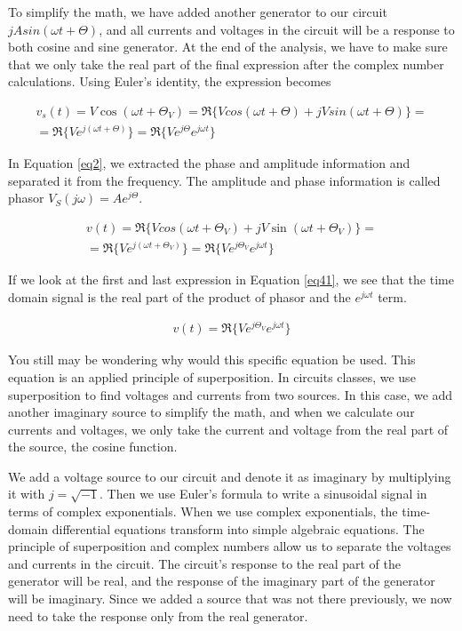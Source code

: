 \documentclass{ximera}
\begin{document}
To simplify the math, we have added another generator to our circuit $j A sin (\omega t + \Theta)$, and all currents and voltages in the circuit will be a response to both cosine and sine generator. At the end of the analysis,  we have to make sure that we only take the real part of the final expression after the complex number calculations. Using
 Euler's identity, the expression becomes


\begin{eqnarray}
v_s(t)=  V \cos (\omega t + \Theta_V)=\Re\{ V cos (\omega t + \Theta ) + j V sin (\omega t + \Theta)\}= \nonumber \\ 
= \Re\{V e^{j(\omega t + \Theta)}\}=\Re\{V e^{j \Theta} e^{j \omega t}\} \label{eq2}
\end{eqnarray}

In Equation \ref{eq2}, we extracted the phase and amplitude information
and separated it from the frequency. The amplitude and phase information is called phasor $V_S (j \omega)=A e^{j \Theta}$. 
 
\begin{eqnarray}
v(t)= \Re\{ V cos (\omega t + \Theta_V ) + j V \sin (\omega t + \Theta_V)\}= \nonumber \\ =\Re\{V e^{j(\omega t + \Theta_V)}\}=\Re\{V e^{j \Theta_V} e^{j \omega t}\} \label{eq41}
\end{eqnarray}

If we look at the first and last expression in Equation \ref{eq41}, we see that the time domain signal is the real part of the product of phasor and the $e^{j \omega t}$ term. 

\begin{eqnarray}
v(t)=\Re\{V e^{j \Theta_V} e^{j \omega t}\} \label{eq41a} 
\end{eqnarray}



You still may be wondering why would this specific equation be used. This equation is an applied principle of superposition. In circuits classes, we use superposition to find voltages and currents from two sources. In this case, we add another imaginary source to simplify the math, and when we calculate our currents and voltages, we only take the current and voltage from the real part of the source, the cosine function.

We add a voltage source to our circuit and denote it as imaginary by multiplying it with $j=\sqrt{-1}$. Then we use Euler's formula to write a sinusoidal signal in terms of complex exponentials. When we use complex exponentials, the time-domain differential equations transform into simple algebraic equations. The principle of superposition and complex numbers allow us to separate the voltages and currents in the circuit. The circuit's response to the real part of the generator will be real, and the response of the imaginary part of the generator will be imaginary. Since we added a source that was not there previously, we now need to take the response only from the real generator.
\end{document}

